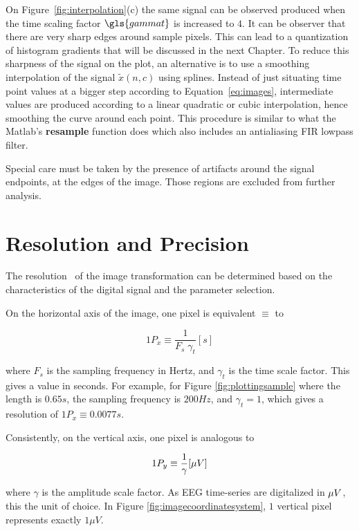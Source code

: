 On Figure~\ref{fig:interpolation}(c) the same signal can be observed produced when the time scaling factor $\gls{gammat}$ is increased to $4$. It can be observer that there are very sharp edges around sample pixels.  This can lead to a quantization of histogram gradients that will be discussed in the next Chapter. To reduce this sharpness of the signal on the plot, an alternative is to use a smoothing interpolation of the signal $\tilde{x}(n,c)$ using splines.  Instead of just situating time point values at a bigger step according to Equation~\ref{eq:images}, intermediate values are produced according to a linear quadratic or cubic interpolation, hence smoothing the curve around each point.  This procedure is similar to what the Matlab's \textbf{resample} function does which also includes an antialiasing FIR lowpass filter.

Special care must be taken by the presence of artifacts around the signal endpoints, at the edges of the image. Those regions are excluded from further analysis.

\section{Resolution and Precision}

The resolution~\cite{Cohen2014} of the image transformation can be determined based on the characteristics of the digital signal and the parameter selection.

On the horizontal axis of the image, one pixel is equivalent $\equiv$ to 

\begin{equation}
1 P_x \equiv \frac{1}{F_s  \; \gamma_t}  [\si{s}]
\label{eq:resolutionx}
\end{equation}

\noindent where $F_s$ is the sampling frequency in Hertz, and $\gamma_t$ is the time scale factor.  This gives a value in seconds.  For example, for Figure \ref{fig:plottingsample} where the length is $0.65 s$, the sampling frequency is $200 Hz$, and $\gamma_t = 1$, which gives a resolution of $1 P_x \equiv 0.0077 s$. 

Consistently, on the vertical axis, one pixel is analogous to 

\begin{equation}
1 P_y \equiv \frac{1}{\gamma}  [\si\mu{V}]
\label{eq:resolutiony}
\end{equation}

\noindent where $\gamma$ is the amplitude scale factor.  As EEG time-series are digitalized in $\si\mu{V}$, this the unit of choice.  In Figure \ref{fig:imagecoordinatesystem}, $1$ vertical pixel represents exactly $1 \mu V$.

